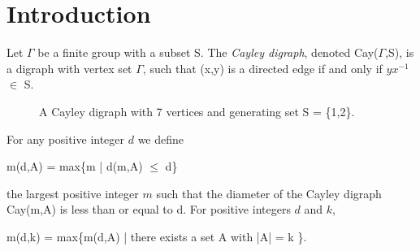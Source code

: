 

\section{Introduction}

Let $\Gamma$ be a finite group with a subset S. The \emph{Cayley digraph}, denoted Cay($\Gamma$,S), is a digraph with vertex set $\Gamma$, such that (x,y) is a directed edge if and only if $yx^{-1}$ $\in$ S. 

 
\begin{figure}[h]
\begin{center}

\end{center}
\caption{ A Cayley digraph with 7 vertices and generating set S = \{1,2\}.}
\end{figure}

For any positive integer $d$ we define

\begin{center}
m(d,A) = max\{m | d(m,A) $\leq$ d\}
\end{center}

the largest positive integer $m$ such that the diameter of the Cayley digraph Cay(m,A) is less than or equal to d. For positive integers $d$ and $k$, 

\begin{center}
m(d,k) = max\{m(d,A) | there exists a set A with |A| = k \}.
\end{center}

